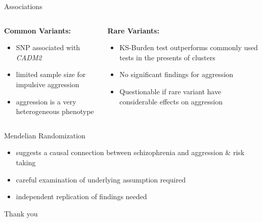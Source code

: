 \documentclass{beamer}
\begin{document}
\begin{frame}[t]{Associations}
  \small
  \begin{columns}[T]
    \begin{column}[T]{0.5\textwidth}
     \textbf{Common Variants:}
     \begin{itemize}
       \item SNP associated with \textit{CADM2}
       \item limited sample size for impulsive aggression
       \item aggression is a very heterogeneous phenotype
     \end{itemize}
   \end{column}
   \begin{column}[T]{0.5\textwidth}
     \textbf{Rare Variants:}
     \begin{itemize}
       \item KS-Burden test outperforms commonly used tests in the presents of clusters
       \item No significant findings for aggression
       \item Questionable if rare variant have considerable effects on aggression
     \end{itemize}
   \end{column}
 \end{columns} 
\end{frame}

\begin{frame}[t]{Mendelian Randomization}
  \begin{itemize}
    \item suggests a causal connection between schizophrenia and aggression \& risk taking
    \item careful examination of underlying assumption required
    \item independent replication of findings needed
  \end{itemize}
\end{frame}

\begin{frame}[t]{Thank you}
  
\end{frame}


\end{document}
